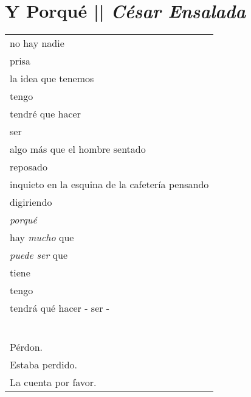 \section[Y Porqué]{Y Porqué || \emph{César Ensalada} \hspace*{\fill}  \thepage}
\hspace{0pt}
\vfill
\begin{center}
\begin{tabular}{l}
no hay nadie \\
\hspace{9.5mm} prisa \\
\hspace{9.5mm} la idea que tenemos \\
\hspace{26mm} tengo \\
\hspace{26mm} tendré que hacer \\
\hspace{43mm}ser \\
algo más que el hombre sentado\\
\hspace{33mm} reposado\\
\hspace{33mm} inquieto en la esquina de la cafetería pensando \\
\hspace{84.5mm} digiriendo \\
\hspace{70mm}\emph{porqué} \\
\hspace{50mm} hay \emph{mucho} que\\
\hspace{50mm} \emph{puede ser} que\\
\hspace{70mm} tiene \\
\hspace{70mm} tengo\\
\hspace{70mm} tendrá qué hacer
\hspace{2.25mm} -
\hspace{2.25mm} ser - \\

\-\ \\ \\Pérdon.\\
Estaba perdido.\\
La cuenta por favor.

\end{tabular}
\end{center}
\vfill
\hspace{0pt}